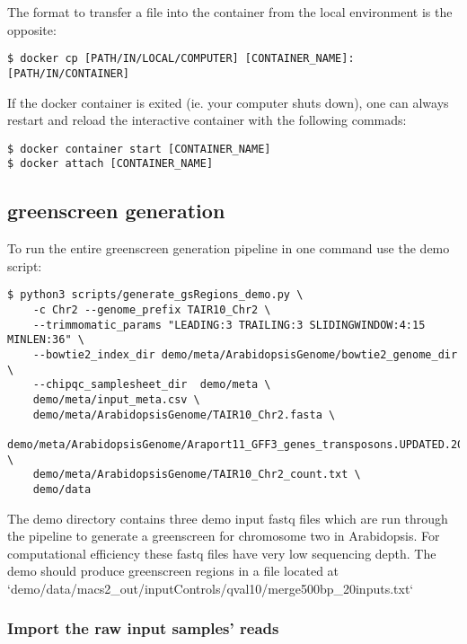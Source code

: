 \documentclass{article}
\begin{document}
\begin{sloppypar}
The format to transfer a file into the container from the local environment is the opposite:

\begin{verbatim}
$ docker cp [PATH/IN/LOCAL/COMPUTER] [CONTAINER_NAME]:[PATH/IN/CONTAINER] 
\end{verbatim}

If the docker container is exited (ie. your computer shuts down), one can always restart and reload the interactive container with the following commads:

\begin{verbatim}
$ docker container start [CONTAINER_NAME]
$ docker attach [CONTAINER_NAME] 
\end{verbatim}

\subsection{greenscreen generation}

To run the entire greenscreen generation pipeline in one command use the demo script:

\begin{verbatim}
$ python3 scripts/generate_gsRegions_demo.py \
    -c Chr2 --genome_prefix TAIR10_Chr2 \
    --trimmomatic_params "LEADING:3 TRAILING:3 SLIDINGWINDOW:4:15 MINLEN:36" \
    --bowtie2_index_dir demo/meta/ArabidopsisGenome/bowtie2_genome_dir \
    --chipqc_samplesheet_dir  demo/meta \
    demo/meta/input_meta.csv \
    demo/meta/ArabidopsisGenome/TAIR10_Chr2.fasta \
    demo/meta/ArabidopsisGenome/Araport11_GFF3_genes_transposons.UPDATED.201606.Chr2.gff \
    demo/meta/ArabidopsisGenome/TAIR10_Chr2_count.txt \
    demo/data
\end{verbatim}

The demo directory contains three demo input fastq files which are run through the pipeline to generate a greenscreen for chromosome two in Arabidopsis. For computational efficiency these fastq files have very low sequencing depth. The demo should produce greenscreen regions in a file located at `demo/data/macs2\_out/inputControls/qval10/merge500bp\_20inputs.txt`

\subsubsection{Import the raw input samples' reads}


\end{sloppypar}
\end{document}

